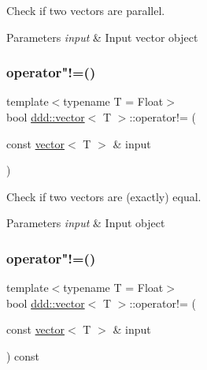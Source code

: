 Check if two vectors are parallel. 


\begin{DoxyParams}{Parameters}
{\em input} & Input vector object \\
\hline
\end{DoxyParams}
\mbox{\label{classddd_1_1vector_a83fb6aea4121e7737ab7642aae23e2df}} 
\subsubsection{\texorpdfstring{operator"!=()}{operator!=()}\hspace{0.1cm}{\footnotesize\ttfamily [1/2]}}
{\footnotesize\ttfamily template$<$typename T = Float$>$ \\
bool \hyperlink{classddd_1_1vector}{ddd\+::vector}$<$ T $>$\+::operator!= (\begin{DoxyParamCaption}\item[{const \hyperlink{classddd_1_1vector}{vector}$<$ T $>$ \&}]{input }\end{DoxyParamCaption})\hspace{0.3cm}{\ttfamily [inline]}}



Check if two vectors are (exactly) equal. 


\begin{DoxyParams}{Parameters}
{\em input} & Input object \\
\hline
\end{DoxyParams}
\mbox{\label{classddd_1_1vector_a8c18336941576daaff53568d424a27bd}} 
\subsubsection{\texorpdfstring{operator"!=()}{operator!=()}\hspace{0.1cm}{\footnotesize\ttfamily [2/2]}}
{\footnotesize\ttfamily template$<$typename T = Float$>$ \\
bool \hyperlink{classddd_1_1vector}{ddd\+::vector}$<$ T $>$\+::operator!= (\begin{DoxyParamCaption}\item[{const \hyperlink{classddd_1_1vector}{vector}$<$ T $>$ \&}]{input }\end{DoxyParamCaption}) const\hspace{0.3cm}{\ttfamily [inline]}}



